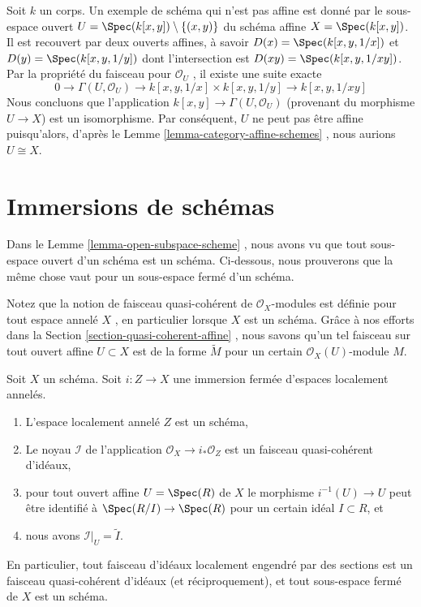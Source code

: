 \begin{example}
\label{example-not-affine}
Soit  $k$  un corps. Un exemple de schéma qui n'est pas affine est donné
par le sous-espace ouvert  $U = \Spec(k[x, y]) \setminus \{ (x, y)\}$  du schéma affine  $X =\Spec(k[x, y])$. Il est
recouvert par deux ouverts affines, à savoir  $D(x) = \Spec(k[x, y, 1/x])$  et  $D(y) = \Spec(k[x, y, 1/y])$  dont
l'intersection est  $D(xy) = \Spec(k[x, y, 1/xy])$. Par la propriété du faisceau pour  $\mathcal{O}_U$ ,
il existe une suite exacte
$$
0 \to
\Gamma(U, \mathcal{O}_U) \to
k[x, y, 1/x] \times k[x, y, 1/y] \to
k[x, y, 1/xy]
$$
Nous concluons que l'application  $k[x, y] \to \Gamma(U, \mathcal{O}_U)$  (provenant du morphisme
 $U \to X$) est un isomorphisme. Par conséquent,  $U$  ne peut pas être
affine puisqu'alors, d'après le Lemme  \ref{lemma-category-affine-schemes} , nous aurions  $U \cong X$.
\end{example}











\section{Immersions de schémas}
\label{section-immersions}

\noindent
Dans le Lemme  \ref{lemma-open-subspace-scheme} , nous avons vu que tout sous-espace ouvert d'un schéma
est un schéma. Ci-dessous, nous prouverons que la même chose vaut pour un
sous-espace fermé d'un schéma.

\medskip\noindent
Notez que la notion de faisceau quasi-cohérent de  $\mathcal{O}_X$-modules est définie
pour tout espace annelé  $X$ , en particulier lorsque  $X$  est un
schéma. Grâce à nos efforts dans la Section  \ref{section-quasi-coherent-affine} , nous savons qu'un tel
faisceau sur tout ouvert affine  $U \subset X$  est de la forme  $\widetilde M$  pour un
certain  $\mathcal{O}_X(U)$-module  $M$.

\begin{lemma}
\label{lemma-closed-subspace-scheme}
Soit  $X$  un schéma. Soit  $i : Z \to X$  une immersion fermée d'espaces
localement annelés.
\begin{enumerate}
\item L'espace localement annelé  $Z$  est un schéma,
\item Le noyau  $\mathcal{I}$  de l'application  $\mathcal{O}_X \to i_*\mathcal{O}_Z$  est un faisceau quasi-cohérent
d'idéaux,
\item pour tout ouvert affine  $U = \Spec(R)$  de  $X$  le morphisme  $i^{-1}(U) \to U$ 
peut être identifié à  $\Spec(R/I) \to \Spec(R)$  pour un certain idéal  $I \subset R$, et
\item nous avons  $\mathcal{I}|_U = \widetilde I$.
\end{enumerate}
En particulier, tout faisceau d'idéaux localement engendré par des sections est un
faisceau quasi-cohérent d'idéaux (et réciproquement), et tout sous-espace fermé de
 $X$  est un schéma.
\end{lemma}

